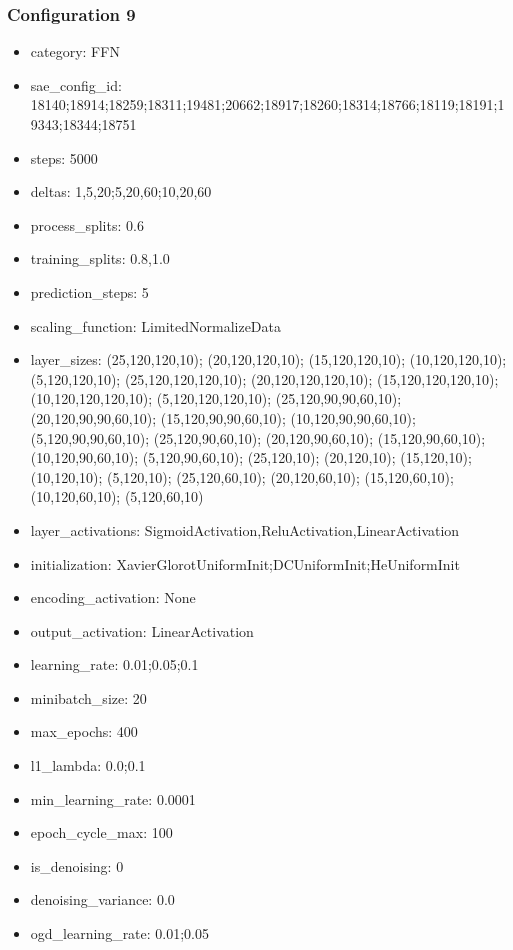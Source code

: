 \documentclass[a4paper,11pt,oneside]{article}
\theoremstyle{plain}
\theoremstyle{definition}
\begin{document}
\subsubsection{Configuration 9}\label{config9}
\begin{itemize}
	\item category: FFN
	\item sae\_config\_id: 18140;18914;18259;18311;19481;20662;18917;18260;18314;18766;18119;18191;19343;18344;18751
	\item steps: 5000
	\item deltas: 1,5,20;5,20,60;10,20,60
	\item process\_splits: 0.6
	\item training\_splits: 0.8,1.0
	\item prediction\_steps: 5
	\item scaling\_function: LimitedNormalizeData
	\item layer\_sizes: (25,120,120,10); (20,120,120,10); (15,120,120,10); (10,120,120,10); (5,120,120,10); (25,120,120,120,10); (20,120,120,120,10); (15,120,120,120,10); (10,120,120,120,10); (5,120,120,120,10); (25,120,90,90,60,10); (20,120,90,90,60,10); (15,120,90,90,60,10); (10,120,90,90,60,10); (5,120,90,90,60,10); (25,120,90,60,10); (20,120,90,60,10); (15,120,90,60,10); (10,120,90,60,10); (5,120,90,60,10); (25,120,10); (20,120,10); (15,120,10); (10,120,10); (5,120,10); (25,120,60,10); (20,120,60,10); (15,120,60,10); (10,120,60,10); (5,120,60,10)
	\item layer\_activations: SigmoidActivation,ReluActivation,LinearActivation
	\item initialization: XavierGlorotUniformInit;DCUniformInit;HeUniformInit
	\item encoding\_activation: None
	\item output\_activation: LinearActivation
	\item learning\_rate: 0.01;0.05;0.1
	\item minibatch\_size: 20
	\item max\_epochs: 400
	\item l1\_lambda: 0.0;0.1
	\item min\_learning\_rate: 0.0001
	\item epoch\_cycle\_max: 100
	\item is\_denoising: 0
	\item denoising\_variance: 0.0
	\item ogd\_learning\_rate: 0.01;0.05
\end{itemize}
\end{document}
